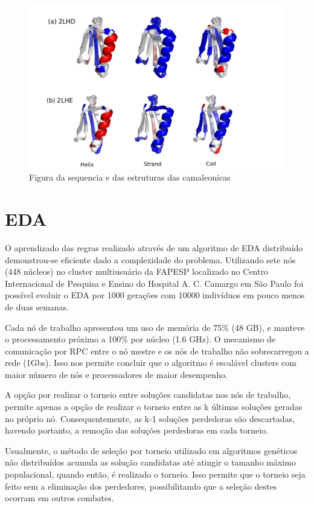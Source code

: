 \begin{figure}
  \centering
  \includegraphics[width=1\textwidth]{figures/camel_2lhd_2lhe.pdf}
  \caption{Figura da sequencia e das estruturas das camaleonicas}
        \label{fig:camel_2lhd_2lhe}
\end{figure}


\section{EDA}

O aprendizado das regras realizado através de um algoritmo de EDA distribuído demonstrou-se eficiente dado a complexidade do problema. Utilizando sete nós (448 núcleos) no cluster multiusuário da FAPESP localizado no Centro Internacional de Pesquisa e Ensino do Hospital A. C. Camargo em  São Paulo foi possível evoluir o EDA por 1000 gerações com 10000 indivíduos em pouco menos de duas semanas.

Cada nó de trabalho apresentou um uso de memória de 75\% (48 GB), e manteve o processamento próximo a 100\% por núcleo (1.6 GHz). O mecanismo de comunicação por RPC entre o nó mestre e os nós de trabalho não sobrecarregou a rede (1Gbs). Isso nos permite concluir que o algoritmo é escalável clusters com maior número de nós e processadores de maior desempenho.

A opção por realizar o torneio entre soluções candidatas nos nós de trabalho, permite apenas a opção de realizar o torneio entre as k últimas soluções geradas no próprio nó. Consequentemente, as k-1 soluções perdedoras são descartadas, havendo portanto, a remoção das soluções perdedoras em cada torneio. 

Usualmente, o método de seleção por torneio utilizado em algoritmos genéticos não distribuídos acumula as solução candidatas até atingir o tamanho máximo populacional, quando então, é realizado o torneio. Isso permite que o torneio seja feito sem a eliminação dos perdedores, possibilitando que a seleção destes ocorram em outros combates.

